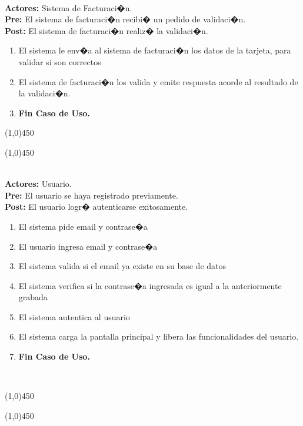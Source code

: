 \documentclass[11pt, a4paper, spanish]{article}
\begin{document}
 \\
\textbf{Actores:} Sistema de Facturaci�n. \\
\textbf{Pre:} El sistema de facturaci�n recibi� un pedido de validaci�n. \\
\textbf{Post:} El sistema de facturaci�n realiz� la validaci�n.\\
\begin{enumerate}
	\item El sistema le env�a al sistema de facturaci�n los datos de la tarjeta, para validar si son correctos
	\item El sistema de facturaci�n los valida y emite respuesta acorde al resultado de la validaci�n.
	\item \textbf{Fin Caso de Uso.}
\end{enumerate}
\begin{center} \line(1,0){450} \end{center}
\newpage
\begin{center} \line(1,0){450} \end{center}

 \\
\textbf{Actores:} Usuario. \\
\textbf{Pre:} El usuario se haya registrado previamente. \\
\textbf{Post:} El usuario logr� autenticarse exitosamente.\\
\begin{enumerate}
	\item El sistema pide email y contrase�a
	\item El usuario ingresa email y contrase�a
	\item El sistema valida si el email ya existe en su base de datos
	\item El sistema verifica si la contrase�a ingresada es igual a la anteriormente grabada
	\item El sistema autentica al usuario
	\item El sistema carga la pantalla principal y libera las funcionalidades del usuario.
	\item \textbf{Fin Caso de Uso.}
\end{enumerate}
 \\
\begin{center} \line(1,0){450} \end{center}
\newpage
\begin{center} \line(1,0){450} \end{center}
\end{document}
